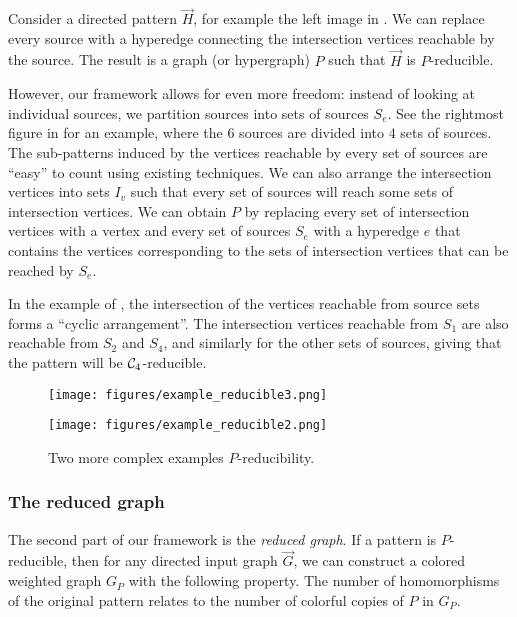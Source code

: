 \documentclass[a4paper,UKenglish,cleveref, autoref, numberwithinsect, thm-restate]{lipics-v2021}
\newcommand{\reducible}[1]{${#1}$-reducible}
\newcommand{\reduced}[1]{G_{#1}}
\newcommand{\cycle}[1]{\cC_{#1}}
\newcommand{\cC}{{\cal C}}
\begin{document}
	Consider a directed pattern $\vec{H}$, for example the left image in . We can replace every source with a hyperedge connecting the intersection vertices reachable by the source. The result is a graph (or hypergraph) $P$ such that $\vec{H}$ is \reducible{P}. 
	
	However, our framework allows for even more freedom: instead of looking at individual sources, we partition sources into sets of sources $S_e$. See the rightmost figure in  for an example, where the $6$ sources are divided into $4$ sets of sources. 
	The sub-patterns induced by the vertices reachable by every set of sources are ``easy'' to count using existing techniques. We can also arrange the intersection vertices into sets $I_v$ such that every set of sources will reach some sets of intersection vertices. We can obtain $P$ by replacing every set of intersection vertices with a vertex and every set of sources $S_e$ with a hyperedge $e$ that contains the vertices corresponding to the sets of intersection vertices that can be reached by $S_e$.
	
	In the example of , the intersection of the vertices reachable from source sets forms a ``cyclic arrangement''. The intersection vertices reachable from $S_1$ are also reachable from $S_2$ and $S_4$, and similarly for the other sets of sources, giving that the pattern will be \reducible{\cycle{4}}. 

	\begin{figure}[t]
		\centering
		\begin{minipage}{.4\linewidth}
			\centering
			\texttt{[image: figures/example\_reducible3.png]}
		\end{minipage}
		\hspace{0.5cm}
		\begin{minipage}{.52\linewidth}
			\centering
			\texttt{[image: figures/example\_reducible2.png]}
		\end{minipage}
		\caption{Two more complex examples $P$-reducibility.} 
		\label{fig:reductions}
	\end{figure}
	
	\subsubsection{The reduced graph} \label{sec:reduced}
	
	The second part of our framework is the \emph{reduced graph}. If a pattern is \reducible{P}, then for any directed input graph $\vec{G}$,
	we can construct a colored weighted graph $\reduced{P}$ with the following property. The number of homomorphisms of the original pattern relates to the number of colorful copies of $P$ in $\reduced{P}$. 
	
\end{document}
